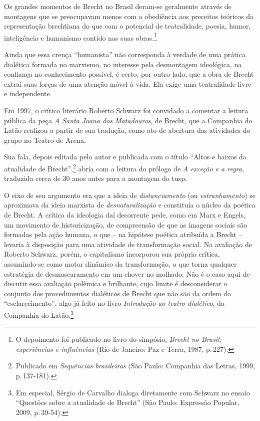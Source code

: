 \startblockquote
Os grandes momentos de Brecht no Brasil deram-se geralmente através de
montagens que se preocupavam menos com a obediência aos preceitos
teóricos da representação brechtiana do que com o potencial de
teatralidade, poesia, humor, inteligência e humanismo contido nas suas
obras.\footnote{O depoimento foi publicado no livro do simpósio,
  {\it Brecht no Brasil: experiências e influências} (Rio de Janeiro:
  Paz e Terra, 1987, p.\,227).}
\stopblockquote

Ainda que essa crença “humanista” não corresponda à verdade de uma
prática dialética formada no marxismo, no interesse pela desmontagem
ideológica, na confiança no conhecimento possível, é certo, por outro
lado, que a obra de Brecht extrai suas forças de uma atenção móvel à
vida. Ela exige uma teatralidade livre e independente.

Em 1997, o crítico literário Roberto Schwarz foi convidado a comentar a
leitura pública da peça {\it A Santa Joana dos Matadouros}, de Brecht,
que a Companhia do Latão realizou a partir de sua tradução, como ato de
abertura das atividades do grupo no Teatro de Arena.

Sua fala, depois editada pelo autor e publicada com o título
“Altos e baixos da atualidade de Brecht”,\footnote{Publicado em
  {\it Sequências brasileiras} (São Paulo: Companhia das Letras, 1999,
  p.\,137-181).} abria com a leitura do prólogo de {\it A exceção e a
regra}, traduzida cerca de 30 anos antes para a montagem do {\sc tusp}.

O eixo de seu argumento era que a ideia de {\it distanciamento} (ou
{\it estranhamento}) se aproximava da ideia marxista de
{\it desnaturalização} e constituía o núcleo da poética de Brecht. A
crítica da ideologia daí decorrente pede, como em Marx e Engels, um
movimento de historicização, de compreensão de que as imagens sociais
são formadas pela ação humana, o que -- na hipótese poética atribuída a
Brecht -- levaria à disposição para uma atividade de transformação
social. Na avaliação de Roberto Schwarz, porém, o capitalismo incorporou
sua própria crítica, assumindo-se como motor dinâmico da transformação,
o que torna qualquer estratégia de desmascaramento em um chover no molhado.
Não é o caso aqui de discutir essa avaliação polêmica e brilhante, cujo
limite é desconsiderar o conjunto dos procedimentos dialéticos de Brecht
que não são da ordem do “esclarecimento”, algo já feito no livro
{\it Introdução ao teatro dialético}, da Companhia do Latão.\footnote{Em
  especial, Sérgio de Carvalho dialoga diretamente com Schwarz no ensaio
  “Questões sobre a atualidade de Brecht” (São Paulo: Expressão Popular,
  2009, p.\,39-54).}

